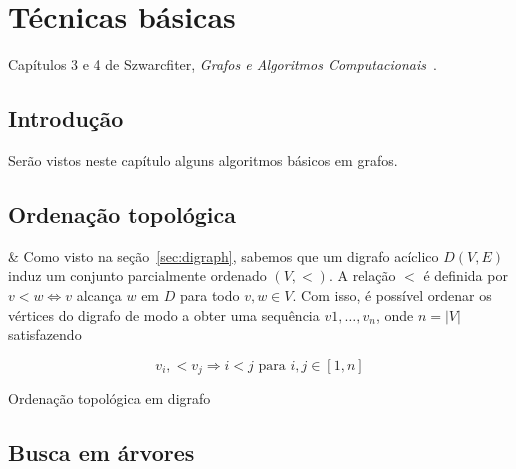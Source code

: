 \chapter{Técnicas básicas}

Capítulos 3 e 4 de Szwarcfiter, \textit{Grafos e Algoritmos Computacionais}~\cite{Szwarcfiter1986grafos}.

\section{Introdução}

Serão vistos neste capítulo alguns algoritmos básicos em grafos.

\section{Ordenação topológica}


\begin{easylist}

  & Como visto na seção~\ref{sec:digraph}, sabemos que um digrafo acíclico $D(V, E)$ induz um conjunto parcialmente ordenado $(V, <)$. A relação $<$ é definida por $v < w \Leftrightarrow v$ alcança $w$ em $D$ para todo $v, w \in V$. Com isso, é possível ordenar os vértices do digrafo de modo a obter uma sequência $v1, \dots, v_n$, onde $n = |V|$ satisfazendo

  \[ v_i, < v_j \Rightarrow i<j \text{ para } i, j \in [1, n] \]

\begin{algorithm}[H]
\SetAlgoLined
{}
 \caption{Ordenação topológica em digrafo}
\end{algorithm}
  
\end{easylist}

\section{Busca em árvores}

\clearpage


